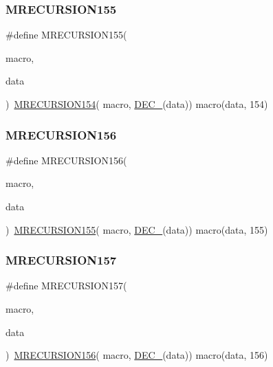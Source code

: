 \subsubsection{\texorpdfstring{MRECURSION155}{MRECURSION155}}
{\footnotesize\ttfamily \#define M\+R\+E\+C\+U\+R\+S\+I\+O\+N155(\begin{DoxyParamCaption}\item[{}]{macro,  }\item[{}]{data }\end{DoxyParamCaption})~\mbox{\hyperlink{group__group__sam0__utils__mrecursion_ga1d5ab6221edda6ab4d5438c93ffc9389}{M\+R\+E\+C\+U\+R\+S\+I\+O\+N154}}(  macro, \mbox{\hyperlink{group__group__sam0__utils__mrecursion_ga1d23d683797679dca8c3512a54a5dcae}{D\+E\+C\+\_\+}}(data))   macro(data, 154)}

\mbox{\label{group__group__sam0__utils__mrecursion_ga87de4a3978fb584862694e65f870c5d2}} 
\subsubsection{\texorpdfstring{MRECURSION156}{MRECURSION156}}
{\footnotesize\ttfamily \#define M\+R\+E\+C\+U\+R\+S\+I\+O\+N156(\begin{DoxyParamCaption}\item[{}]{macro,  }\item[{}]{data }\end{DoxyParamCaption})~\mbox{\hyperlink{group__group__sam0__utils__mrecursion_gae7fdd694998d7f45d73f51305b8d8f1f}{M\+R\+E\+C\+U\+R\+S\+I\+O\+N155}}(  macro, \mbox{\hyperlink{group__group__sam0__utils__mrecursion_ga1d23d683797679dca8c3512a54a5dcae}{D\+E\+C\+\_\+}}(data))   macro(data, 155)}

\mbox{\label{group__group__sam0__utils__mrecursion_ga481d40dbd33826b73a0e2920a726c0f8}} 
\subsubsection{\texorpdfstring{MRECURSION157}{MRECURSION157}}
{\footnotesize\ttfamily \#define M\+R\+E\+C\+U\+R\+S\+I\+O\+N157(\begin{DoxyParamCaption}\item[{}]{macro,  }\item[{}]{data }\end{DoxyParamCaption})~\mbox{\hyperlink{group__group__sam0__utils__mrecursion_ga87de4a3978fb584862694e65f870c5d2}{M\+R\+E\+C\+U\+R\+S\+I\+O\+N156}}(  macro, \mbox{\hyperlink{group__group__sam0__utils__mrecursion_ga1d23d683797679dca8c3512a54a5dcae}{D\+E\+C\+\_\+}}(data))   macro(data, 156)}

